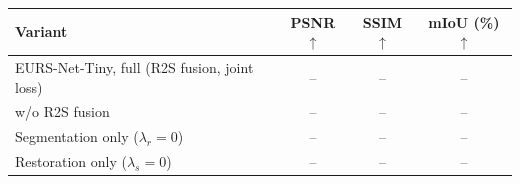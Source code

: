 \begin{tabular}{lccc}
\toprule
Variant & PSNR$\uparrow$ & SSIM$\uparrow$ & mIoU (\%)$\uparrow$ \\
\midrule
EURS-Net-Tiny, full (R2S fusion, joint loss) & -- & -- & -- \\
w/o R2S fusion & -- & -- & -- \\
Segmentation only ($\lambda_r{=}0$) & -- & -- & -- \\
Restoration only ($\lambda_s{=}0$) & -- & -- & -- \\
\bottomrule
\end{tabular}
